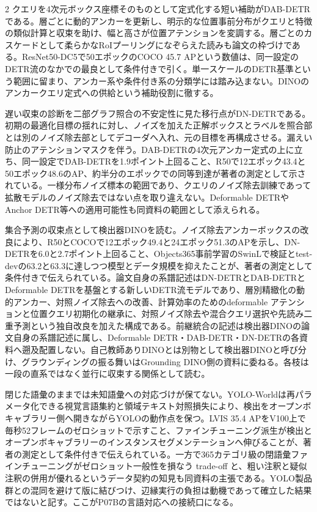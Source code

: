 \documentclass[lualatex,a4paper,10pt]{jlreq}
\begin{document}
\begin{multicols}{2}
\noindent クエリを4次元ボックス座標そのものとして定式化する短い補助がDAB-DETRである。層ごとに動的アンカーを更新し、明示的な位置事前分布がクエリと特徴の類似計算と収束を助け、幅と高さが位置アテンションを変調する。層ごとのカスケードとして柔らかなRoIプーリングになぞらえた読みも論文の枠づけである。ResNet50-DC5で50エポックのCOCO 45.7 APという数値は、同一設定のDETR流のなかでの最良として条件付きで引く。単一スケールのDETR基準という範囲に留まり、アンカー系や条件付き系の分類学には踏み込まない。DINOのアンカークエリ定式への供給という補助役割に徹する。\autocite{vmd124}\par\medskip
\noindent 遅い収束の診断を二部グラフ照合の不安定性に見た移行点がDN-DETRである。初期の最適化目標の揺れに対し、ノイズを加えた正解ボックスとラベルを照合部とは別のノイズ除去部としてデコーダへ入れ、元の目標を再構成させる。漏えい防止のアテンションマスクを伴う。DAB-DETRの4次元アンカー定式の上に立ち、同一設定でDAB-DETRを1.9ポイント上回ること、R50で12エポック43.4と50エポック48.6のAP、約半分のエポックでの同等到達が著者の測定として示されている。一様分布ノイズ標本の範囲であり、クエリのノイズ除去訓練であって拡散モデルのノイズ除去ではない点を取り違えない。Deformable DETRやAnchor DETR等への適用可能性も同資料の範囲として添えられる。\autocite{vmd125}\par\medskip
\noindent 集合予測の収束点として検出器DINOを読む。ノイズ除去アンカーボックスの改良により、R50とCOCOで12エポック49.4と24エポック51.3のAPを示し、DN-DETRを6.0と2.7ポイント上回ること、Objects365事前学習のSwinLで検証とtest-devの63.2と63.3に達しつつ模型とデータ規模を抑えたことが、著者の測定として条件付きで伝えられている。論文自身の系譜記述はDN-DETRとDAB-DETRとDeformable DETRを基盤とする新しいDETR流モデルであり、層別精緻化の動的アンカー、対照ノイズ除去への改善、計算効率のためのdeformable アテンションと位置クエリ初期化の継承に、対照ノイズ除去や混合クエリ選択や先読み二重予測という独自改良を加えた構成である。前継統合の記述は検出器DINOの論文自身の系譜記述に属し、Deformable DETR・DAB-DETR・DN-DETRの各資料へ遡及配置しない。自己教師ありDINOとは別物として検出器DINOと呼び分け、グラウンディングの振る舞いはGrounding DINO側の資料に委ねる。各枝は一段の直系ではなく並行に収束する関係として読む。\autocite{vmd011}\par\medskip
\noindent 閉じた語彙のままでは未知語彙への対応づけが保てない。YOLO-Worldは再パラメータ化できる視覚言語集約と領域テキスト対照損失により、検出をオープンボキャブラリー側へ開きながらYOLOの動作点を保つ。LVIS 35.4 APをV100上で毎秒52フレームのゼロショットで示すこと、ファインチューニング派生が検出とオープンボキャブラリーのインスタンスセグメンテーションへ伸びることが、著者の測定として条件付きで伝えられている。一方で365カテゴリ級の閉語彙ファインチューニングがゼロショット一般性を損なう trade-off と、粗い注釈と疑似注釈の併用が優れるというデータ契約の知見も同資料の主張である。YOLO製品群との混同を避けて版に結びつけ、辺縁実行の負担は動機であって確立した結果ではないと記す。ここがP07Bの言語対応への接続口になる。\autocite{vmd012}\par\medskip
\end{multicols}
\end{document}
